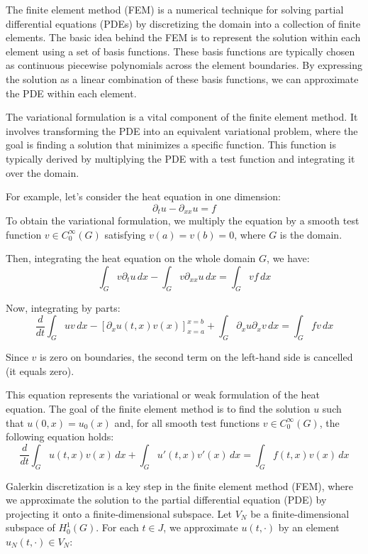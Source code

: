 The finite element method (FEM) is a numerical technique for solving partial differential equations (PDEs) by discretizing the domain into a collection of finite elements. The basic idea behind the FEM is to represent the solution within each element using a set of basis functions. These basis functions are typically chosen as continuous piecewise polynomials across the element boundaries. By expressing the solution as a linear combination of these basis functions, we can approximate the PDE within each element.

The variational formulation is a vital component of the finite element method. It involves transforming the PDE into an equivalent variational problem, where the goal is finding a solution that minimizes a specific function. This function is typically derived by multiplying the PDE with a test function and integrating it over the domain.

For example, let's consider the heat equation in one dimension:
\[
\partial_t u - \partial_{xx} u = f
\]
To obtain the variational formulation, we multiply the equation by a smooth test function \(v \in C^{\infty}_0(G)\) satisfying \(v(a) = v(b) = 0\), where \(G\) is the domain. 

Then, integrating the heat equation on the whole domain \(G\), we have:
\[
\int_G v \partial_t u\, dx - \int_G v \partial_{xx} u\, dx = \int_G vf\, dx
\]

Now, integrating by parts:
\[
\frac{{d}}{{dt}}\int_G u v \, dx - \left[\partial_x u (t, x) v(x) \right]_{x=a}^{x=b} + \int_G \partial_{x} u \partial_{x} v\, dx = \int_G f v\, dx
\]

Since $v$ is zero on boundaries, the second term on the left-hand side is cancelled (it equals zero).

This equation represents the variational or weak formulation of the heat equation. The goal of the finite element method is to find the solution \(u\) such that \(u(0, x) = u_0(x)\) and, for all smooth test functions \(v \in C^{\infty}_0(G)\), the following equation holds:
\[
\frac{{d}}{{dt}}\int_G u(t, x)v(x)\, dx + \int_G u'(t, x) v'(x)\, dx = \int_G f(t, x) v(x)\, dx
\]


Galerkin discretization is a key step in the finite element method (FEM), where we approximate the solution to the partial differential equation (PDE) by projecting it onto a finite-dimensional subspace. Let \(V_N\) be a finite-dimensional subspace of \(H^1_0(G)\). For each \(t \in J\), we approximate \(u(t, \cdot)\) by an element \(u_N(t, \cdot) \in V_N\):

